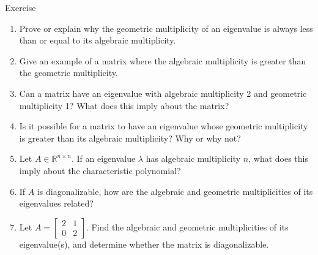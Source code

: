 \begin{frame}{Exercise}
\begin{enumerate}
    \item Prove or explain why the geometric multiplicity of an eigenvalue is always less than or equal to its algebraic multiplicity.
    \item Give an example of a matrix where the algebraic multiplicity is greater than the geometric multiplicity.
    \item Can a matrix have an eigenvalue with algebraic multiplicity 2 and geometric multiplicity 1? What does this imply about the matrix?
    \item Is it possible for a matrix to have an eigenvalue whose geometric multiplicity is greater than its algebraic multiplicity? Why or why not?
    \item Let \( A \in \mathbb{R}^{n \times n} \). If an eigenvalue \( \lambda \) has algebraic multiplicity \( n \), what does this imply about the characteristic polynomial?
    \item If \( A \) is diagonalizable, how are the algebraic and geometric multiplicities of its eigenvalues related?
    \item Let \( A = \begin{bmatrix} 2 & 1 \\ 0 & 2 \end{bmatrix} \). Find the algebraic and geometric multiplicities of its eigenvalue(s), and determine whether the matrix is diagonalizable.
\end{enumerate}
\end{frame}




